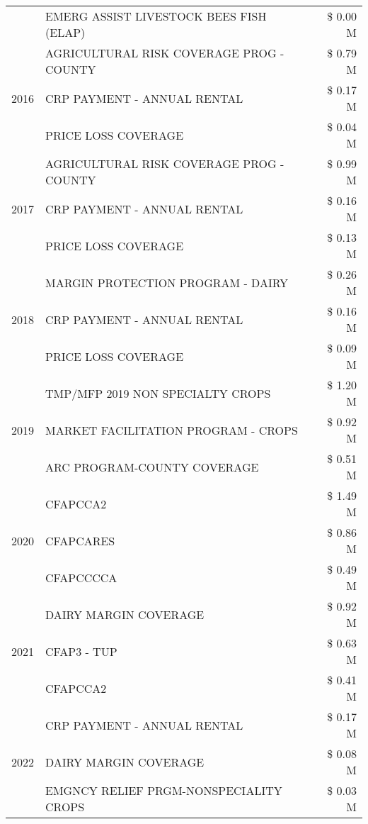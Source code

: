 \begin{tabular}{llr}
 & EMERG ASSIST LIVESTOCK BEES FISH (ELAP) & \$ 0.00 M \\
\cline{1-3}
\multirow[t]{3}{*}{2016} & AGRICULTURAL RISK COVERAGE PROG - COUNTY & \$ 0.79 M \\
 & CRP PAYMENT - ANNUAL RENTAL & \$ 0.17 M \\
 & PRICE LOSS COVERAGE & \$ 0.04 M \\
\cline{1-3}
\multirow[t]{3}{*}{2017} & AGRICULTURAL RISK COVERAGE PROG - COUNTY & \$ 0.99 M \\
 & CRP PAYMENT - ANNUAL RENTAL & \$ 0.16 M \\
 & PRICE LOSS COVERAGE & \$ 0.13 M \\
\cline{1-3}
\multirow[t]{3}{*}{2018} & MARGIN PROTECTION PROGRAM - DAIRY & \$ 0.26 M \\
 & CRP PAYMENT - ANNUAL RENTAL & \$ 0.16 M \\
 & PRICE LOSS COVERAGE & \$ 0.09 M \\
\cline{1-3}
\multirow[t]{3}{*}{2019} & TMP/MFP 2019 NON SPECIALTY CROPS & \$ 1.20 M \\
 & MARKET FACILITATION PROGRAM - CROPS & \$ 0.92 M \\
 & ARC PROGRAM-COUNTY COVERAGE & \$ 0.51 M \\
\cline{1-3}
\multirow[t]{3}{*}{2020} & CFAPCCA2 & \$ 1.49 M \\
 & CFAPCARES & \$ 0.86 M \\
 & CFAPCCCCA & \$ 0.49 M \\
\cline{1-3}
\multirow[t]{3}{*}{2021} & DAIRY MARGIN COVERAGE & \$ 0.92 M \\
 & CFAP3 - TUP & \$ 0.63 M \\
 & CFAPCCA2 & \$ 0.41 M \\
\cline{1-3}
\multirow[t]{3}{*}{2022} & CRP PAYMENT - ANNUAL RENTAL & \$ 0.17 M \\
 & DAIRY MARGIN COVERAGE & \$ 0.08 M \\
 & EMGNCY RELIEF PRGM-NONSPECIALITY CROPS & \$ 0.03 M \\
\cline{1-3}
\bottomrule
\end{tabular}
